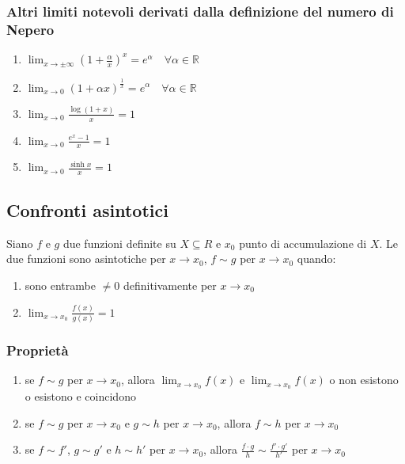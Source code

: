 \documentclass[a4paper]{article}
\begin{document}
\subsubsection*{Altri limiti notevoli derivati dalla definizione del numero di Nepero}
\begin{enumerate}
	\item \(\displaystyle \lim_{x \to \pm \infty} \left(1 + \frac{\alpha}{x} \right) ^ x = e ^ \alpha \quad \forall \alpha \in \mathbb{R}\)
	\item \(\displaystyle \lim_{x \to 0} \left( 1 + \alpha x \right) ^ \frac{1}{x} = e ^ \alpha \quad \forall \alpha \in \mathbb{R}\)
	\item \(\displaystyle \lim_{x \to 0} \frac{\log \left( 1 + x \right)}{x} = 1\)
	\item \(\displaystyle \lim_{x \to 0} \frac{ e ^ x - 1 }{x} = 1\)
	\item \(\displaystyle \lim_{x \to 0} \frac{\sinh x}{x} = 1\)
\end{enumerate}

\subsection{Confronti asintotici}
Siano \(f\) e \(g\) due funzioni definite su \(X \subseteq R\) e \(x_0\) punto di accumulazione di \(X\). Le due funzioni sono asintotiche per \(x \to x_0\),
\(f \sim g\) per \(x \to x_0\) quando:
\begin{enumerate}
	\item sono entrambe \(\neq 0\) definitivamente per \(x \to x_0\)
	\item \(\displaystyle \lim_{x \to x_0} \frac{f(x)}{g(x)} = 1\)
\end{enumerate}

\subsubsection*{Proprietà}
\begin{enumerate}
	\item se \(f \sim g\) per \(x \to x_0\), allora \(\displaystyle \lim_{x \to x_0} f(x)\) e \(\displaystyle \lim_{x \to x_0} f(x)\) o non esistono o esistono e coincidono
	\item se \(f \sim g\) per \(x \to x_0\) e \(g \sim h\) per \(x \to x_0\), allora \(f \sim h\) per \(x \to x_0\)
	\item se \(f \sim f'\), \(g \sim g'\) e \(h \sim h'\) per \(x \to x_0\), allora \(\displaystyle \frac{f \cdot g}{h} \sim \frac{f' \cdot g'}{h'}\) per \(x \to x_0\)
\end{enumerate}
\end{document}
